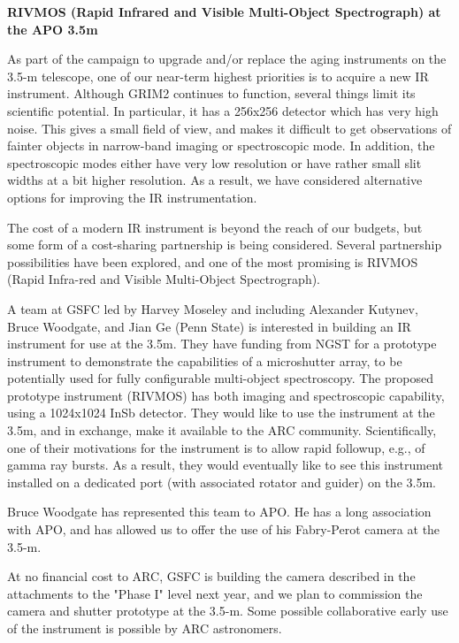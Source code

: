 \documentclass{article}
\begin{document}
\begin{LARGE}
\begin{center}
\textbf{RIVMOS (Rapid Infrared and Visible Multi-Object Spectrograph) at the APO 3.5m}
\end{center}
\end{LARGE}

As part of the campaign to upgrade and/or replace the aging 
instruments on the 3.5-m telescope, one of our near-term highest 
priorities is to acquire a new IR instrument.  Although GRIM2 continues
to function, several things limit its scientific potential.
In particular, it has a 256x256 detector which has very high noise. This
gives a small field of view, and makes it difficult to get observations
of fainter objects in narrow-band imaging or spectroscopic mode. In
addition, the spectroscopic modes either have very low resolution or
have rather small slit widths at a bit higher resolution. As a result, we
have considered alternative options for improving the IR instrumentation.

The cost of a modern IR instrument is beyond the reach of our 
budgets, but some form of a cost-sharing partnership is being 
considered.  Several partnership possibilities have been explored, 
and one of the most promising is RIVMOS (Rapid Infra-red and Visible 
Multi-Object Spectrograph).

A team at GSFC led by Harvey Moseley and including Alexander Kutynev, Bruce
Woodgate, and Jian Ge (Penn State) is interested in building an IR instrument for use
at the 3.5m. They have funding from NGST for a prototype instrument 
to demonstrate the capabilities of a microshutter array, to be
potentially used for fully configurable multi-object spectroscopy. The
proposed prototype instrument (RIVMOS) has both imaging and spectroscopic
capability, using a 1024x1024 InSb detector. They would like to use the
instrument at the 3.5m, and in exchange, make it available to the ARC
community. Scientifically, one of their motivations for the instrument
is to allow rapid followup, e.g., of gamma ray bursts. As a result, they
would eventually like to see this instrument installed on a dedicated port
(with associated rotator and guider) on the 3.5m.

Bruce Woodgate has represented this team to APO. He
has a long association with APO, and has 
allowed us to offer the use of his Fabry-Perot camera at the 3.5-m. 

At no financial cost to ARC, GSFC is building the camera described 
in the attachments to the "Phase I" level next year, and we plan to 
commission the camera and shutter prototype at the 3.5-m.  Some 
possible collaborative early use of the instrument is possible by ARC 
astronomers.
\end{document}
